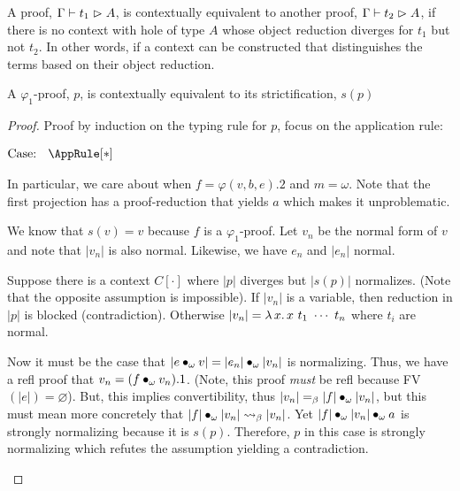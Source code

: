 A proof, $\Gamma \vdash t_1 \vartriangleright A$, is contextually equivalent to another proof, $\Gamma \vdash t_2 \vartriangleright A$, if there is no context with hole of type $A$ whose object reduction diverges for $t_1$ but not $t_2$.
In other words, if a context can be constructed that distinguishes the terms based on their object reduction.

\begin{lemma}
    A $\varphi_1$-proof, $p$, is contextually equivalent to its strictification, $s(p)$
\end{lemma}
\begin{proof}
    Proof by induction on the typing rule for $p$, focus on the application rule:

    $\text{Case: }\begin{array}{c} \AppRule[*] \end{array}$
    \begin{proofcase}
        In particular, we care about when $f = \varphi(v, b, e).2$ and $m = \omega$.
        Note that the first projection has a proof-reduction that yields $a$ which makes it unproblematic.

        We know that $s(v) = v$ because $f$ is a $\varphi_1$-proof.
        Let $v_n$ be the normal form of $v$ and note that $|v_n|$ is also normal.
        Likewise, we have $e_n$ and $|e_n|$ normal.

        Suppose there is a context $C[\cdot]$ where $|p|$ diverges but $|s(p)|$ normalizes.
        (Note that the opposite assumption is impossible).
        If $|v_n|$ is a variable, then reduction in $|p|$ is blocked (contradiction).
        Otherwise $|v_n| = {\lambda}\, x.\, x\ t_1\ \cdots\ t_n$ where $t_i$ are normal.

        Now it must be the case that $|e \bullet_{\omega} v| = |e_n| \bullet_{\omega} |v_n|$ is normalizing.
        Thus, we have a refl proof that $v_n = (f \bullet_{\omega} v_n).1$.
        (Note, this proof \textit{must} be refl because FV$(|e|) = \varnothing$).
        But, this implies convertibility, thus $|v_n| =_\beta |f| \bullet_{\omega} |v_n|$, but this must mean more concretely that $|f| \bullet_{\omega} |v_n| \rightsquigarrow_\beta |v_n|$.
        Yet $|f| \bullet_{\omega} |v_n| \bullet_{\omega} a$ is strongly normalizing because it is $s(p)$.
        Therefore, $p$ in this case is strongly normalizing which refutes the assumption yielding a contradiction.
    \end{proofcase}
    
\end{proof}

